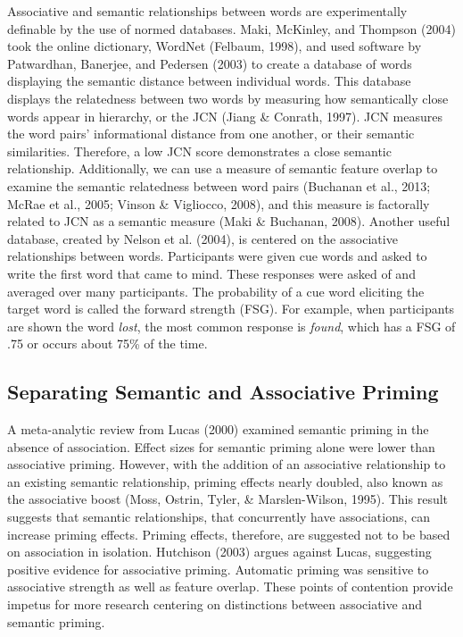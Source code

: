 \documentclass[english,man]{apa6}
\theoremstyle{definition}
\theoremstyle{definition}
\theoremstyle{definition}
\theoremstyle{remark}
\begin{document}
Associative and semantic relationships between words are experimentally
definable by the use of normed databases. Maki, McKinley, and Thompson
(2004) took the online dictionary, WordNet (Felbaum, 1998), and used
software by Patwardhan, Banerjee, and Pedersen (2003) to create a
database of words displaying the semantic distance between individual
words. This database displays the relatedness between two words by
measuring how semantically close words appear in hierarchy, or the JCN
(Jiang \& Conrath, 1997). JCN measures the word pairs' informational
distance from one another, or their semantic similarities. Therefore, a
low JCN score demonstrates a close semantic relationship. Additionally,
we can use a measure of semantic feature overlap to examine the semantic
relatedness between word pairs (Buchanan et al., 2013; McRae et al.,
2005; Vinson \& Vigliocco, 2008), and this measure is factorally related
to JCN as a semantic measure (Maki \& Buchanan, 2008). Another useful
database, created by Nelson et al. (2004), is centered on the
associative relationships between words. Participants were given cue
words and asked to write the first word that came to mind. These
responses were asked of and averaged over many participants. The
probability of a cue word eliciting the target word is called the
forward strength (FSG). For example, when participants are shown the
word \emph{lost}, the most common response is \emph{found}, which has a
FSG of .75 or occurs about 75\% of the time.

\subsection{Separating Semantic and Associative
Priming}\label{separating-semantic-and-associative-priming}

A meta-analytic review from Lucas (2000) examined semantic priming in
the absence of association. Effect sizes for semantic priming alone were
lower than associative priming. However, with the addition of an
associative relationship to an existing semantic relationship, priming
effects nearly doubled, also known as the associative boost (Moss,
Ostrin, Tyler, \& Marslen-Wilson, 1995). This result suggests that
semantic relationships, that concurrently have associations, can
increase priming effects. Priming effects, therefore, are suggested not
to be based on association in isolation. Hutchison (2003) argues against
Lucas, suggesting positive evidence for associative priming. Automatic
priming was sensitive to associative strength as well as feature
overlap. These points of contention provide impetus for more research
centering on distinctions between associative and semantic priming.
\end{document}
